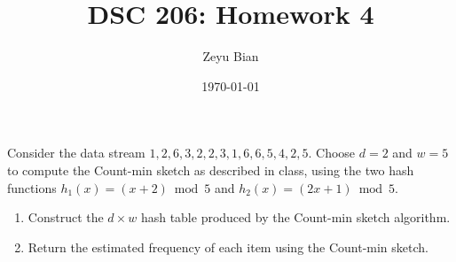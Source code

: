 \documentclass[en,hazy,blue,12pt,normal]{../../elegantnote}
\title{DSC 206: Homework 4}
\author{Zeyu Bian}
\date{\today}
\begin{document}
\maketitle

\begin{homework}
Consider the data stream $1,2,6,3,2,2,3,1,6,6,5,4,2,5$. Choose $d=2$ and $w=5$ to compute the
Count-min sketch as described in class, using the two hash functions
$h_1(x)=(x+2)\bmod 5$ and $h_2(x)=(2x+1)\bmod 5$.
\begin{enumerate}
    \item[(a)] Construct the $d\times w$ hash table produced by the Count-min sketch algorithm.
    \item[(b)] Return the estimated frequency of each item using the Count-min sketch.
\end{enumerate}
\end{homework}
\end{document}
